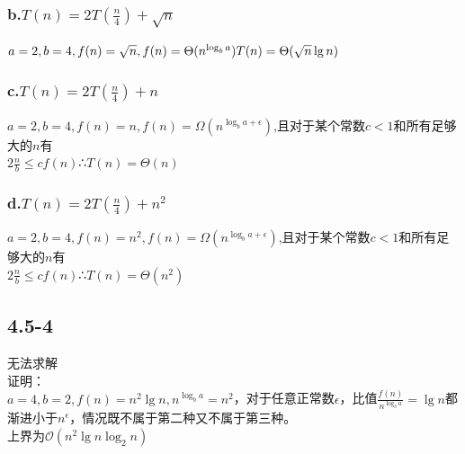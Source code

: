 \documentclass[UTF8]{ctexart}
\begin{document}
\subsubsection{b.$T(n)=2T(\frac{n}{4})+\sqrt n$}
$a=2,b=4,f(n)=\sqrt n,f(n)=\Theta(n^{\log_ba})\\ T(n)=\Theta(\sqrt n\lg n)$
\subsubsection{c.$T(n)=2T(\frac{n}{4})+n$} 
$a=2,b=4,f(n)=n,f(n)=\Omega(n^{\log_ba+\epsilon})$,且对于某个常数$c<1$和所有足够大的$n$有\\$2\frac{n}{b}\leq cf(n)$∴$T(n)=\Theta(n)$
\subsubsection{d.$T(n)=2T(\frac{n}{4})+n^{2}$}
$a=2,b=4,f(n)=n^{2},f(n)=\Omega(n^{\log_ba+\epsilon})$,且对于某个常数$c<1$和所有足够大的$n$有\\$2\frac{n}{b}\leq cf(n)$∴$T(n)=\Theta(n^{2})$

\subsection{4.5-4}
无法求解\\
证明：\\
$a=4,b=2,f(n)=n^2\lg n,n^{\log_ba}=n^{2}$，对于任意正常数$\epsilon$，比值$\frac{f(n)}{n^{\log_ba}}=\lg n$都渐进小于$n^{\epsilon}$，情况既不属于第二种又不属于第三种。
\\上界为$\mathcal{O}(n^{2}\lg n\log_2n)$
\end{document}
